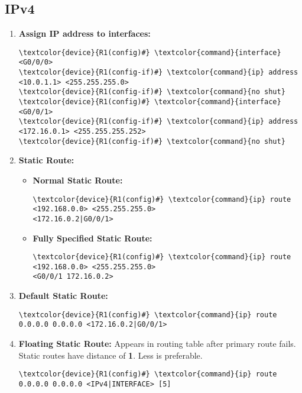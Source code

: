 \documentclass[10pt, a4paper, onecolumn, oneside, titlepage, openany]{book}
\begin{document}
\subsection{IPv4}
\begin{enumerate}
    \item \textbf{Assign IP address to interfaces:}
\begin{Verbatim}[commandchars=\\\{\}]
\textcolor{device}{R1(config)#} \textcolor{command}{interface} <G0/0/0>
\textcolor{device}{R1(config-if)#} \textcolor{command}{ip} address <10.0.1.1> <255.255.255.0>
\textcolor{device}{R1(config-if)#} \textcolor{command}{no shut}
\textcolor{device}{R1(config)#} \textcolor{command}{interface} <G0/0/1>
\textcolor{device}{R1(config-if)#} \textcolor{command}{ip} address <172.16.0.1> <255.255.255.252>
\textcolor{device}{R1(config-if)#} \textcolor{command}{no shut}
\end{Verbatim}
    \item \textbf{Static Route:}
    \begin{itemize}
        \item \textbf{Normal Static Route:}
\begin{Verbatim}[commandchars=\\\{\}]
\textcolor{device}{R1(config)#} \textcolor{command}{ip} route <192.168.0.0> <255.255.255.0>
<172.16.0.2|G0/0/1>
\end{Verbatim}
        \item \textbf{Fully Specified Static Route:}
\begin{Verbatim}[commandchars=\\\{\}]
\textcolor{device}{R1(config)#} \textcolor{command}{ip} route <192.168.0.0> <255.255.255.0>
<G0/0/1 172.16.0.2>
\end{Verbatim}
        \end{itemize}
    \item \textbf{Default Static Route:}
\begin{Verbatim}[commandchars=\\\{\}]
\textcolor{device}{R1(config)#} \textcolor{command}{ip} route 0.0.0.0 0.0.0.0 <172.16.0.2|G0/0/1>
\end{Verbatim}
    \item \textbf{Floating Static Route:}
\newline Appears in routing table after primary route fails.
\newline Static routes have distance of \textbf{1}. Less is preferable.
\begin{Verbatim}[commandchars=\\\{\}]
\textcolor{device}{R1(config)#} \textcolor{command}{ip} route 0.0.0.0 0.0.0.0 <IPv4|INTERFACE> [5]
\end{Verbatim}
\end{enumerate}
\end{document}
